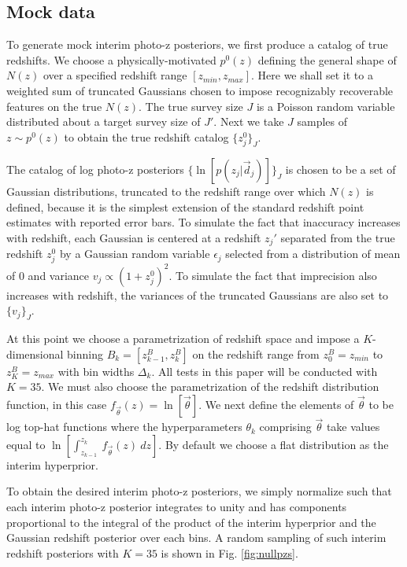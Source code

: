 \documentclass[preprint]{aastex}
\begin{document}
\clearpage
\subsection{Mock data}
\label{sec:mock}

To generate mock interim photo-z posteriors, we first produce a catalog of true 
redshifts.  We choose a physically-motivated $p^{0}(z)$ defining the general 
shape of $N(z)$ over a specified redshift range $[z_{min},z_{max}]$.  Here we 
shall set it to a weighted sum of truncated Gaussians chosen to impose 
recognizably recoverable features on the true $N(z)$.  The true survey size $J$ 
is a Poisson random variable distributed about a target survey size of $J'$.  
Next we take $J$ samples of $z\sim p^{0}(z)$ to obtain the true redshift 
catalog $\{z_{j}^{0}\}_{J}$.  

The catalog of log photo-z posteriors $\{\ln[p(z_{j}|\vec{d}_{j})]\}_{J}$ is 
chosen to be a set of Gaussian distributions, truncated to the redshift range 
over which $N(z)$ is defined, because it is the simplest extension of the 
standard redshift point estimates with reported error bars.  To simulate the 
fact that inaccuracy increases with redshift, each Gaussian is centered at a 
redshift $z_{j}'$ separated from the true redshift $z_{j}^{0}$ by a Gaussian 
random variable $\epsilon_{j}$ selected from a distribution of mean of 0 and 
variance $v_{j}\propto(1+z_{j}^{0})^{2}$.  To simulate the fact that 
imprecision also increases with redshift, the variances of the truncated 
Gaussians are also set to $\{v_{j}\}_{J}$.

At this point we choose a parametrization of redshift space and impose a 
$K$-dimensional binning $B_{k}=[z^{B}_{k-1},z^{B}_{k}]$ on the redshift range 
from $z^{B}_{0}=z_{min}$ to $z^{B}_{K}=z_{max}$ with bin widths $\Delta_{k}$.  
All tests in this paper will be conducted with $K=35$.  We must also choose the 
parametrization of the redshift distribution function, in this case 
$f_{\vec{\theta}}(z)=\ln[\vec{\theta}]$.  We next define the elements of 
$\vec{\theta}$ to be log top-hat functions where the hyperparameters 
$\theta_{k}$ comprising $\vec{\theta}$ take values equal to 
$\ln[\int_{z_{k-1}}^{z_{k}}\ f_{\vec{\theta}}(z)\ dz]$.  By default we choose a 
flat distribution as the interim hyperprior.

To obtain the desired interim photo-z posteriors, we simply normalize such that 
each interim photo-z posterior integrates to unity and has components 
proportional to the integral of the product of the interim hyperprior and the 
Gaussian redshift posterior over each bins.  A random sampling of such interim 
redshift posteriors with $K=35$ is shown in Fig. \ref{fig:nullpzs}.
\end{document}
